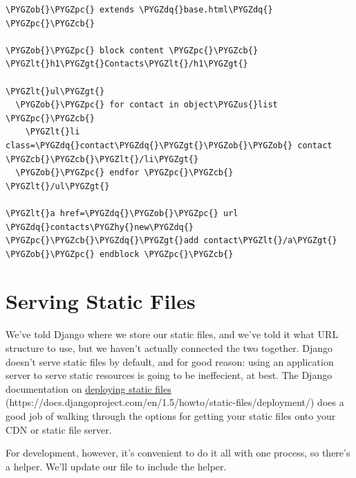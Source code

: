 \documentclass[letterpaper,10pt,english]{sphinxmanual}
\def\PYGZus{\char`\_}
\def\PYGZob{\char`\{}
\def\PYGZcb{\char`\}}
\def\PYGZlt{\char`\<}
\def\PYGZgt{\char`\>}
\def\PYGZpc{\char`\%}
\def\PYGZhy{\char`\-}
\def\PYGZdq{\char`\"}
\begin{document}
\begin{Verbatim}[commandchars=\\\{\}]
\PYGZob{}\PYGZpc{} extends \PYGZdq{}base.html\PYGZdq{} \PYGZpc{}\PYGZcb{}

\PYGZob{}\PYGZpc{} block content \PYGZpc{}\PYGZcb{}
\PYGZlt{}h1\PYGZgt{}Contacts\PYGZlt{}/h1\PYGZgt{}

\PYGZlt{}ul\PYGZgt{}
  \PYGZob{}\PYGZpc{} for contact in object\PYGZus{}list \PYGZpc{}\PYGZcb{}
    \PYGZlt{}li class=\PYGZdq{}contact\PYGZdq{}\PYGZgt{}\PYGZob{}\PYGZob{} contact \PYGZcb{}\PYGZcb{}\PYGZlt{}/li\PYGZgt{}
  \PYGZob{}\PYGZpc{} endfor \PYGZpc{}\PYGZcb{}
\PYGZlt{}/ul\PYGZgt{}

\PYGZlt{}a href=\PYGZdq{}\PYGZob{}\PYGZpc{} url \PYGZdq{}contacts\PYGZhy{}new\PYGZdq{} \PYGZpc{}\PYGZcb{}\PYGZdq{}\PYGZgt{}add contact\PYGZlt{}/a\PYGZgt{}
\PYGZob{}\PYGZpc{} endblock \PYGZpc{}\PYGZcb{}
\end{Verbatim}


\section{Serving Static Files}
\label{tutorial/static:serving-static-files}
We've told Django where we store our static files, and we've told it
what URL structure to use, but we haven't actually connected the two
together. Django doesn't serve static files by default, and for good
reason: using an application server to serve static resources is going
to be ineffecient, at best. The Django documentation on \href{https://docs.djangoproject.com/en/1.5/howto/static-files/deployment/}{deploying
static files} (https://docs.djangoproject.com/en/1.5/howto/static-files/deployment/) does a good job of walking through the options for
getting your static files onto your CDN or static file server.

For development, however, it's convenient to do it all with one
process, so there's a helper. We'll update our 
file to include the  helper.
\end{document}
